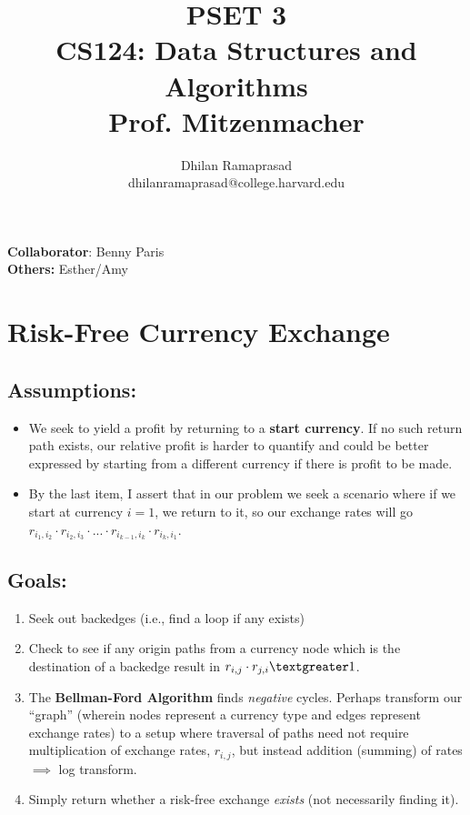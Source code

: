 \documentclass[conference]{styles/acmsiggraph}
\title{\huge PSET 3 \\ \LARGE {CS124: Data Structures and Algorithms \\ Prof. Mitzenmacher}}
\author{\Large Dhilan Ramaprasad \\ dhilanramaprasad@college.harvard.edu}
\newcommand{\?}{\stackrel{?}{=}}
\begin{document}
\maketitle

\textbf{Collaborator}: Benny Paris \\
\textbf{Others:} Esther/Amy

\newpage


\section{Risk-Free Currency Exchange}
\subsection{Assumptions:}
\begin{itemize}[label= ---]
    \item We seek to yield a profit by returning to a \textbf{start currency}. If no such return path exists, our relative profit is harder to quantify and could be better expressed by starting from a different currency if there is profit to be made.
    \item By the last item, I assert that in our problem we seek a scenario where if we start at currency $i=1$, we return to it, so our exchange rates will go $r_{i_1,i_2}\cdot r_{i_2,i_3}\cdot...\cdot r_{i_{k-1},i_k}\cdot r_{i_k,i_1}$.
\end{itemize}

\subsection{Goals:}
\begin{enumerate}
    \item Seek out backedges (i.e., find a loop if any exists)
    \item Check to see if any origin paths from a currency node which is the destination of a backedge result in $r_{i,j}\cdot r_{j,i} \textgreater 1$.
    \item The \textbf{Bellman-Ford Algorithm} finds \textit{negative} cycles.  Perhaps transform our \enquote{graph} (wherein nodes represent a currency type and edges represent exchange rates) to a setup where traversal of paths need not require multiplication of exchange rates, $r_{i,j}$, but instead addition (summing) of rates $\implies$ log transform.
    \item Simply return whether a risk-free exchange \textit{exists} (not necessarily finding it).
\end{enumerate}
\end{document}
